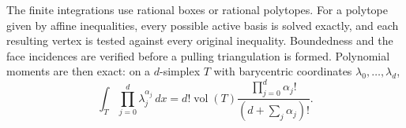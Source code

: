 The finite integrations use rational boxes or rational polytopes.
For a polytope given by affine inequalities, every possible active
basis is solved exactly, and each resulting vertex is tested against
every original inequality.  Boundedness and the face incidences are
verified before a pulling triangulation is formed.  Polynomial
moments are then exact: on a $d$-simplex $T$ with barycentric
coordinates $\lambda_0,\ldots,\lambda_d$,
\begin{equation}
 \int_T\prod_{j=0}^d\lambda_j^{\alpha_j}\,dx
 =d!\operatorname{vol}(T)
   \frac{\prod_{j=0}^d\alpha_j!}{(d+\sum_j\alpha_j)!}.
 \label{num:simplex-moment}
\end{equation}
